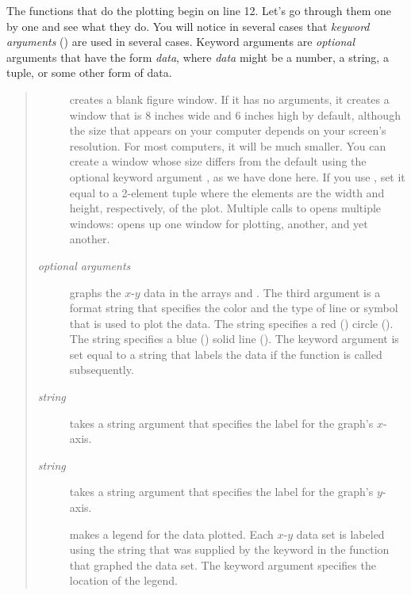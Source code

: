 \documentclass[letterpaper,10pt,english]{sphinxmanual}
\begin{document}
The functions that do the plotting begin on line 12.  Let's go through them one by one and see what they do.  You will notice in several cases that \emph{keyword arguments} () are used in several cases.  Keyword arguments are \emph{optional} arguments that have the form  \emph{data}, where \emph{data} might be a number, a string, a tuple, or some other form of data.
\begin{quote}
\begin{description}
\item[{}] \leavevmode
creates a blank figure window.  If it has no arguments, it creates a window that is 8 inches wide and 6 inches high by default, although the size that appears on your computer depends on your screen's resolution.  For most computers, it will be much smaller.  You can create a window whose size differs from the default using the optional keyword argument , as we have done here.  If you use , set it equal to a 2-element tuple where the elements are the width and height, respectively, of the plot.  Multiple calls to  opens multiple windows:   opens up one window for plotting,  another, and  yet another.

\item[{ \emph{optional arguments} \code{)}}] \leavevmode
graphs the $x$-$y$ data in the arrays  and .  The third argument is a format string that specifies the color and the type of line or symbol that is used to plot the data.  The string  specifies a red () circle ().  The string  specifies a blue () solid line (\code{-}).  The keyword argument  is set equal to a string that labels the data if the  function is called subsequently.

\item[{ \emph{string} \code{)}}] \leavevmode
takes a string argument that specifies the label for the graph's $x$-axis.

\item[{ \emph{string} \code{)}}] \leavevmode
takes a string argument that specifies the label for the graph's $y$-axis.

\item[{}] \leavevmode
makes a legend for the data plotted.  Each $x$-$y$ data set is labeled  using the string that was supplied by the  keyword in the  function that graphed the data set.  The  keyword argument specifies the location of the legend.


\end{description}
\end{quote}
\end{document}
